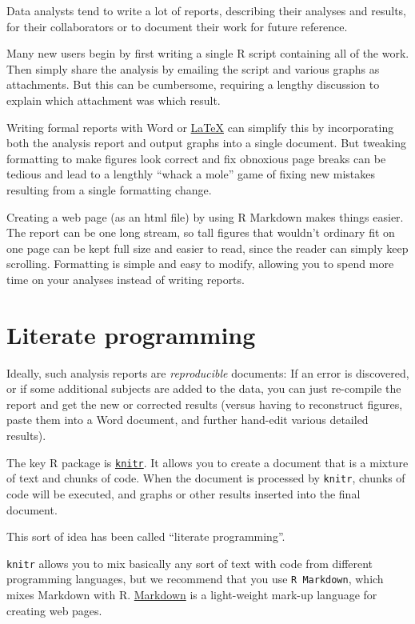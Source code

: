 \documentclass[]{book}
\begin{document}
Data analysts tend to write a lot of reports, describing their analyses
and results, for their collaborators or to document their work for
future reference.

Many new users begin by first writing a single R script containing all
of the work. Then simply share the analysis by emailing the script and
various graphs as attachments. But this can be cumbersome, requiring a
lengthy discussion to explain which attachment was which result.

Writing formal reports with Word or
\href{http://www.latex-project.org/}{LaTeX} can simplify this by
incorporating both the analysis report and output graphs into a single
document. But tweaking formatting to make figures look correct and fix
obnoxious page breaks can be tedious and lead to a lengthly ``whack a
mole'' game of fixing new mistakes resulting from a single formatting
change.

Creating a web page (as an html file) by using R Markdown makes things
easier. The report can be one long stream, so tall figures that wouldn't
ordinary fit on one page can be kept full size and easier to read, since
the reader can simply keep scrolling. Formatting is simple and easy to
modify, allowing you to spend more time on your analyses instead of
writing reports.

\section{Literate programming}\label{literate-programming}

Ideally, such analysis reports are \emph{reproducible} documents: If an
error is discovered, or if some additional subjects are added to the
data, you can just re-compile the report and get the new or corrected
results (versus having to reconstruct figures, paste them into a Word
document, and further hand-edit various detailed results).

The key R package is \href{http://yihui.name/knitr/}{\texttt{knitr}}. It
allows you to create a document that is a mixture of text and chunks of
code. When the document is processed by \texttt{knitr}, chunks of code
will be executed, and graphs or other results inserted into the final
document.

This sort of idea has been called ``literate programming''.

\texttt{knitr} allows you to mix basically any sort of text with code
from different programming languages, but we recommend that you use
\texttt{R\ Markdown}, which mixes Markdown with R.
\href{https://www.markdownguide.org/}{Markdown} is a light-weight
mark-up language for creating web pages.
\end{document}
